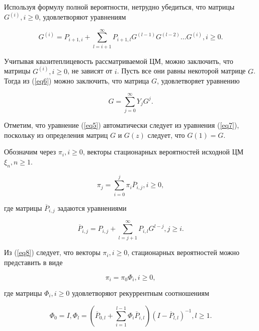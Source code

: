 \documentclass[12pt, a4paper]{article}
\begin{document}
Используя формулу полной вероятности, нетрудно убедиться, что матрицы $G^{(i)}, i \geq 0$, удовлетворяют уравнениям

\begin{equation}
\label{eq6}
G^{(i)} = P_{i + 1, i} + \sum\limits_{l = i + 1}^{\infty} P_{i + 1, l} G^{(l - 1)} G^{(l - 2)} \ldots G^{(i)}, i \geq 0.
\end{equation}

Учитывая квазитеплицевость рассматриваемой ЦМ, можно заключить, что матрицы $G^{(i)}, i \geq 0$, не зависят от $i$. Пусть все они равны некоторой матрице $G$. Тогда из (\ref{eq6}) можно заключить, что матрица $G$, удовлетворяет уравнению 

\begin{equation}
\label{eq7}
G = \sum\limits_{j = 0}^{\infty} Y_j G^j.
\end{equation}

Отметим, что уравнение (\ref{eq5}) автоматически следует из уравнения (\ref{eq7}), поскольку из определения матриц $G$ и $G(z)$ следует, что $G(1) = G$.

Обозначим через $\pi_i, i \geq 0$, векторы стационарных вероятностей исходной ЦМ $\xi_n, n \geq 1$.

\begin{equation}
\label{eq8}
\pi_j = \sum\limits_{i = 0}^{j} \pi_i \overline{P}_{i, j}, i \geq 0, 
\end{equation}

где матрицы $\overline{P}_{i, j}$ задаются уравнениями

\begin{equation}
\label{eq9}
\overline{P}_{i, j} = P_{i, j} + \sum\limits_{l = j + 1}^{\infty} P_{i, l} G^{l - j}, j \geq i. 
\end{equation}

Из (\ref{eq8}) следует, что векторы $\pi_i, i \geq 0$, стационарных вероятностей можно представить в виде

\begin{equation}
\label{eq10}
\pi_i = \pi_0 \Phi_i, i \geq 0, 
\end{equation}

где матрицы $\Phi_i, i \geq 0$ удовлетворяют рекуррентным соотношениям

\begin{equation}
\label{eq11}
\Phi_0 = I, \Phi_l = \left(\overline{P}_{0, l} + \sum\limits_{i = 1}^{l - 1} \Phi_i \overline{P}_{i, l}\right) \left(I - \overline{P}_{l, l}\right)^{-1}, l \geq 1.
\end{equation}
\end{document}
